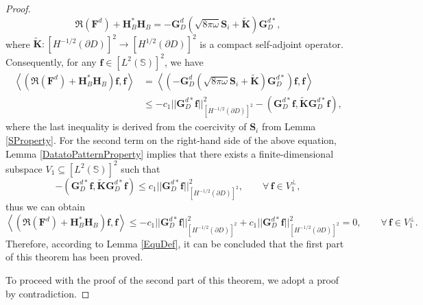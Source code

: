 \documentclass[11pt,reqno,twoside]{amsart}
\theoremstyle{definition}
\theoremstyle{remark}
\numberwithin{equation}{section}
\begin{document}
\begin{proof}
\begin{equation*}%
\Re\left( \mathbf F^d\right)+\mathbf H^*_B\mathbf H_B = -\mathbf G_D^d \left( \sqrt{8\pi\omega} \mathbf S_{i}+\mathbf{\tilde{K}} \right) \mathbf G_D^{d*},
\end{equation*}
where $\mathbf{\tilde{K}}:\left[H^{-1/2}\left(\partial D \right) \right]^2  \to \left[H^{1/2}\left(\partial D \right) \right]^2$ is a compact self-adjoint operator. Consequently, for any $\mathbf f \in \left[L^{2}\left(\mathbb S \right) \right]^2$, we have
\begin{equation*}\begin{aligned}
		\left\langle \left( \Re\left( \mathbf F^d\right)+\mathbf H^*_B\mathbf H_B\right) \mathbf f, \mathbf f\right\rangle 
		&= \left\langle \left(-\mathbf G_D^d \left( \sqrt{8\pi\omega} \mathbf S_{i}+\mathbf{\tilde{K}} \right) \mathbf G_D^{d*} \right) \mathbf f, \mathbf f\right\rangle  \\
		&\leq -c_1 || \mathbf G_D^{d*} \mathbf f ||^2_{\left[H^{-1/2}\left(\partial D \right) \right]^2} - \left(  \mathbf G_D^{d*} \mathbf f, \mathbf{\tilde{K}}\mathbf G_D^{d*} \mathbf f \right) ,
\end{aligned}\end{equation*}
	where the last inequality is derived from the coercivity of $\mathbf S_{i}$ from Lemma \ref{SProperty}. For the second term on the right-hand side of the above equation, Lemma \ref{DatatoPatternProperty} implies that there exists a finite-dimensional subspace \( V_1 \subseteq \left[L^{2}\left(\mathbb S \right) \right]^2 \) such that
	$$
	 - \left(  \mathbf G_D^{d*} \mathbf f, \mathbf{\tilde{K}}\mathbf G_D^{d*} \mathbf f \right) \leq c_1 ||\mathbf G_D^{d*} \mathbf f||_{\left[H^{-1/2}\left(\partial D\right) \right] ^2} ^2, \qquad \forall \, \mathbf f \in V_1^\perp,
	$$
	thus we can obtain 
	$$
	\left\langle \left( \Re\left( \mathbf F^d\right)+\mathbf H^*_B\mathbf H_B\right) \mathbf f, \mathbf f\right\rangle  \leq -c_1 || \mathbf G_D^{d*} \mathbf f ||^2_{\left[H^{-1/2}\left(\partial D \right) \right]^2} + c_1 ||\mathbf G_D^{d*} \mathbf f||_{\left[H^{-1/2}\left(\partial D\right) \right] ^2} ^2=0,\qquad \forall \,\mathbf f \in V_1^\perp.
	$$
	Therefore, according to Lemma \ref{EquDef}, it can be concluded that the first part of this theorem has been proved.
	
	To proceed with the proof of the second part of this theorem, we adopt a proof by contradiction.
	

\end{proof}
\end{document}
